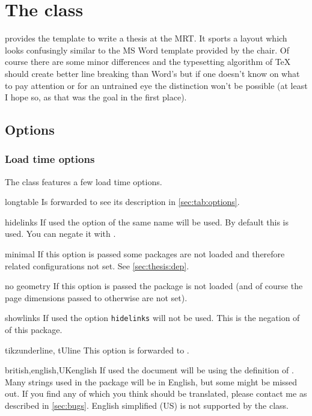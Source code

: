 \chapter{The  class}
 provides the template to write a thesis at the MRT. It sports a
layout which looks confusingly similar to the MS Word template provided by the
chair. Of course there are some minor differences and the typesetting algorithm
of TeX should create better line breaking than Word's but if one doesn't know on
what to pay attention or for an untrained eye the distinction won't be possible
(at least I hope so, as that was the goal in the first place).

\section{Options}%
\subsection{Load time options}\label{sec:thesis:opt}%
The class features a few load time options.
\begin{describeopt}{longtable}
  Is forwarded to  see its description in \autoref{sec:tab:options}.
\end{describeopt}
\begin{describeopt}{hidelinks}
  If used the  option of the same name will be used. By default
  this is used. You can negate it with .
\end{describeopt}
\begin{describeopt}{minimal}
  If this option is passed some packages are not loaded and therefore related
  configurations not set. See \autoref{sec:thesis:dep}.
\end{describeopt}
\begin{describeopt}{no geometry}
  If this option is passed the  package is not loaded (and of
  course the page dimensions passed to  otherwise are not set).
\end{describeopt}
\begin{describeopt}{showlinks}
  If used the  option \verb|hidelinks| will not be used. This is
  the negation of  of this package.
\end{describeopt}
\begin{describeopt}{tikzunderline, tUline}
  This option is forwarded to .
\end{describeopt}
\begin{describeopt}{british,english,UKenglish}
  If used the document will be using the  definition of
  . Many strings used in the package will be in English, but some
  might be missed out. If you find any of which you think should be translated,
  please contact me as described in \autoref{sec:bugs}. English simplified (US)
  is not supported by the class.
\end{describeopt}


